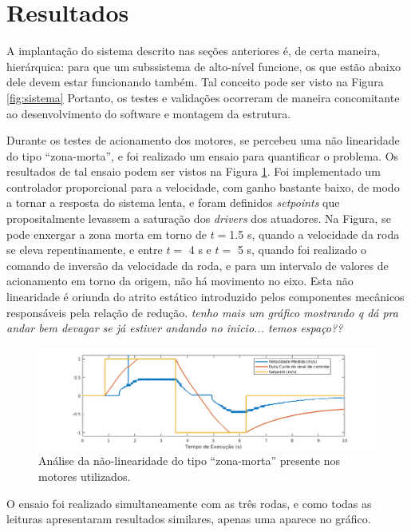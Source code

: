 \section{Resultados}
\label{sec:resultados}

A implantação do sistema descrito nas seções anteriores é, de certa maneira, hierárquica: para que um subssistema de alto-nível funcione, os que estão abaixo dele devem estar funcionando também. Tal conceito pode ser visto na Figura \ref{fig:sistema} Portanto, os testes e validações ocorreram de maneira concomitante ao desenvolvimento do software e montagem da estrutura.

Durante os testes de acionamento dos motores, se percebeu uma não linearidade do tipo ``zona-morta'', e foi realizado um ensaio para quantificar o problema. Os resultados de tal ensaio podem ser vistos na Figura \ref{fig:zonamorta}. Foi implementado um controlador proporcional para a velocidade, com ganho bastante baixo, de modo a tornar a resposta do sistema lenta, e foram definidos \emph{setpoints} que propositalmente levassem a saturação dos \textit{drivers} dos atuadores. Na Figura, se pode enxergar a zona morta em torno de $t=$1.5 s, quando a velocidade da roda se eleva repentinamente, e entre $t=$ 4 s e $t=$ 5 s, quando foi realizado o comando de inversão da velocidade da roda, e para um intervalo de valores de acionamento em torno da origem, não há movimento no eixo. Esta não linearidade é oriunda do atrito estático introduzido pelos componentes mecânicos responsáveis pela relação de redução. \textit{tenho mais um gráfico mostrando q dá pra andar bem devagar se já estiver andando no inicio... temos espaço??}

\begin{figure}[h]
  \centering
  \includegraphics[width = \textwidth]{imagens/zonamorta}
  \caption{Análise da não-linearidade do tipo ``zona-morta'' presente nos motores utilizados.}
  \label{fig:zonamorta}
\end{figure}

O ensaio foi realizado simultaneamente com as três rodas, e como todas as leituras apresentaram resultados similares, apenas uma aparece no gráfico.

